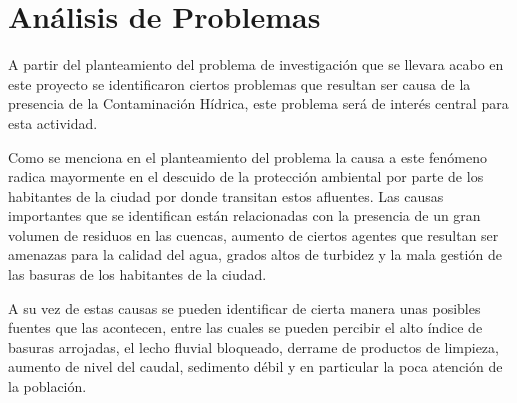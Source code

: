 \section{Análisis de Problemas}
    
    A partir del planteamiento del problema de investigación que se llevara acabo en este proyecto se identificaron ciertos problemas que resultan ser causa de la presencia de la Contaminación Hídrica, este problema será de interés central para esta actividad.

    Como se menciona en el planteamiento del problema la causa a este fenómeno radica mayormente en el descuido de la protección ambiental por parte de los habitantes de la ciudad por donde transitan estos afluentes. Las causas importantes que se identifican están relacionadas con la presencia de un gran volumen de residuos en las cuencas, aumento de ciertos agentes que resultan ser amenazas para la calidad del agua, grados altos de turbidez y la mala gestión de las basuras de los habitantes de la ciudad.

    A su vez de estas causas se pueden identificar de cierta manera unas posibles fuentes que las acontecen, entre las cuales se pueden percibir el alto índice de basuras arrojadas, el lecho fluvial bloqueado, derrame de productos de limpieza, aumento de nivel del caudal, sedimento débil y en particular la poca atención de la población. 
